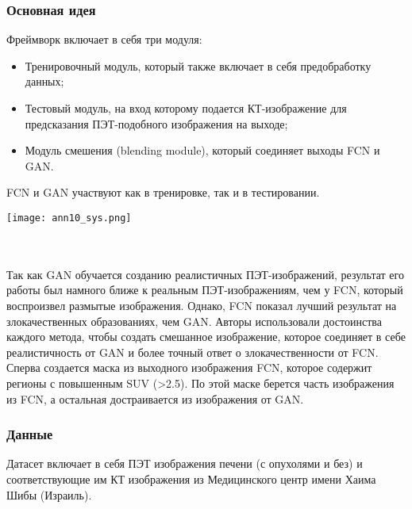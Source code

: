 \subsubsection*{Основная идея}
Фреймворк включает в себя три модуля:
\begin{itemize}
    \item Тренировочный модуль, который также включает в себя предобработку данных;
    \item Тестовый модуль, на вход которому подается КТ-изображение для предсказания 
    ПЭТ-подобного изображения на выходе;
    \item Модуль смешения (blending module), который соединяет выходы FCN и GAN.
\end{itemize}
FCN и GAN участвуют как в тренировке, так и в тестировании.
\\
\begin{minipage}{1.0\linewidth}
    \begin{center}
        \texttt{[image: ann10\_sys.png]} \\
    \end{center}
    
\end{minipage}
\\ \\
Так как GAN обучается созданию реалистичных ПЭТ-изображений, результат его 
работы был намного ближе к реальным ПЭТ-изображениям, чем у FCN, который воспроизвел 
размытые изображения. Однако, FCN показал лучший результат на злокачественных
образованиях, чем GAN. Авторы использовали достоинства каждого метода, чтобы создать 
смешанное изображение, которое соединяет в себе реалистичность от GAN и более точный ответ 
о злокачественности от FCN. Сперва создается маска из выходного изображения FCN, которое 
содержит регионы с повышенным SUV (>2.5). По этой маске берется часть изображения из FCN, а 
остальная достраивается из изображения от GAN.

\subsubsection*{Данные}
Датасет включает в себя ПЭТ изображения печени (с опухолями и без) и соответствующие им
КТ изображения из Медицинского центр имени Хаима Шибы  (Израиль).
